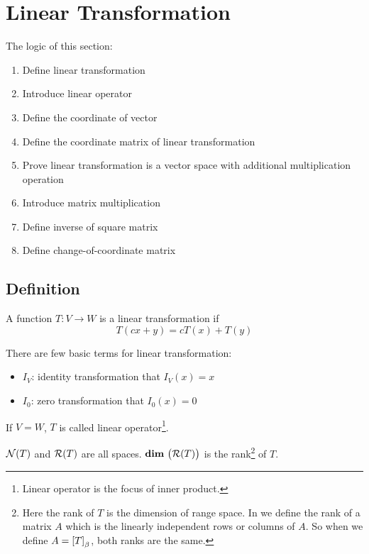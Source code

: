 
\chapter{Linear Transformation}

The logic of this section:
\begin{enumerate}
    \item Define linear transformation
    \item Introduce linear operator
    \item Define the coordinate of vector
    \item Define the coordinate matrix of linear transformation
    \item Prove linear transformation is a vector space with additional multiplication operation
    \item Introduce matrix multiplication
    \item Define inverse of square matrix
    \item Define change-of-coordinate matrix
\end{enumerate}

\section{Definition}

\begin{definition}
    A function $T:V \rightarrow W$ is a linear transformation if 
    \begin{equation}
        T(cx + y) = cT(x) + T(y)
    \end{equation}
\end{definition}

There are few basic terms for linear transformation:
\begin{itemize}
    \item $I_V$: identity transformation that $I_V (x) = x$
    \item $I_0$: zero transformation that $I_0 (x) = 0$
\end{itemize}



\begin{definition}
    If $V = W$, $T$ is called linear operator\footnote{Linear operator is the focus of inner product.}.
\end{definition}


\begin{definition}\label{rank-of-linear-transformation}
    $\nullspace{T}$ and $\rangespace{T}$ are all spaces. $\dimension{\rangespace{T}}$ is the rank\footnote{Here the rank of $T$ is the dimension of range space. In  we define the rank of a matrix $A$ which is the linearly independent rows or columns of $A$. So when we define $A = \coordinate{T}_\beta$, both ranks are the same.} of $T$.
\end{definition}



